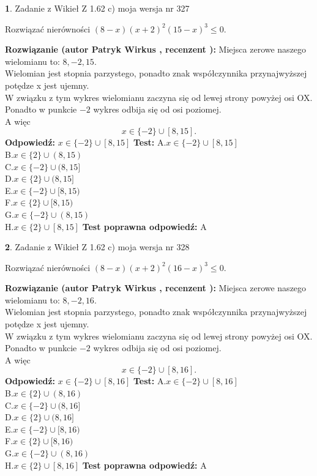 \documentclass[12pt, a4paper]{article}
\theoremstyle{definition} %
\newtheorem{zad}{}
\newcommand{\zadStart}[1]{\begin{zad}#1\newline}
\newcommand{\zadStop}{\end{zad}}
\newcommand{\rozwStart}[2]{\noindent \textbf{Rozwiązanie (autor #1 , recenzent #2): }\newline}
\newcommand{\rozwStop}{\newline}
\newcommand{\odpStart}{\noindent \textbf{Odpowiedź:}\newline}
\newcommand{\odpStop}{\newline}
\newcommand{\testStart}{\noindent \textbf{Test:}\newline}
\newcommand{\testStop}{\newline}
\newcommand{\kluczStart}{\noindent \textbf{Test poprawna odpowiedź:}\newline}
\newcommand{\kluczStop}{\newline}
\begin{document}
\zadStart{Zadanie z Wikieł Z 1.62 c) moja wersja nr 327}

Rozwiązać nierówności $(8-x)(x+2)^{2}(15-x)^{3}\le0$.
\zadStop
\rozwStart{Patryk Wirkus}{}
Miejsca zerowe naszego wielomianu to: $8, -2, 15$.\\
Wielomian jest stopnia parzystego, ponadto znak współczynnika przy\linebreak najwyższej potędze x jest ujemny.\\ W związku z tym wykres wielomianu zaczyna się od lewej strony powyżej osi OX.\\
Ponadto w punkcie $-2$ wykres odbija się od osi poziomej.\\
A więc $$x \in \{-2\} \cup [8,15].$$
\rozwStop
\odpStart
$x \in \{-2\} \cup [8,15]$
\odpStop
\testStart
A.$x \in \{-2\} \cup [8,15]$\\
B.$x \in \{2\} \cup (8,15)$\\
C.$x \in \{-2\} \cup (8,15]$\\
D.$x \in \{2\} \cup (8,15]$\\
E.$x \in \{-2\} \cup [8,15)$\\
F.$x \in \{2\} \cup [8,15)$\\
G.$x \in \{-2\} \cup (8,15)$\\
H.$x \in \{2\} \cup [8,15]$
\testStop
\kluczStart
A
\kluczStop



\zadStart{Zadanie z Wikieł Z 1.62 c) moja wersja nr 328}

Rozwiązać nierówności $(8-x)(x+2)^{2}(16-x)^{3}\le0$.
\zadStop
\rozwStart{Patryk Wirkus}{}
Miejsca zerowe naszego wielomianu to: $8, -2, 16$.\\
Wielomian jest stopnia parzystego, ponadto znak współczynnika przy\linebreak najwyższej potędze x jest ujemny.\\ W związku z tym wykres wielomianu zaczyna się od lewej strony powyżej osi OX.\\
Ponadto w punkcie $-2$ wykres odbija się od osi poziomej.\\
A więc $$x \in \{-2\} \cup [8,16].$$
\rozwStop
\odpStart
$x \in \{-2\} \cup [8,16]$
\odpStop
\testStart
A.$x \in \{-2\} \cup [8,16]$\\
B.$x \in \{2\} \cup (8,16)$\\
C.$x \in \{-2\} \cup (8,16]$\\
D.$x \in \{2\} \cup (8,16]$\\
E.$x \in \{-2\} \cup [8,16)$\\
F.$x \in \{2\} \cup [8,16)$\\
G.$x \in \{-2\} \cup (8,16)$\\
H.$x \in \{2\} \cup [8,16]$
\testStop
\kluczStart
A
\kluczStop
\end{document}
